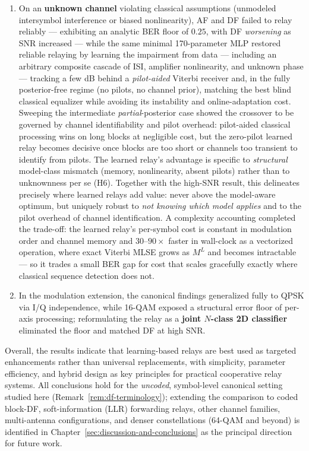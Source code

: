 \begin{enumerate}
    \item On an \textbf{unknown channel} violating classical assumptions (unmodeled intersymbol interference or biased nonlinearity), AF and DF failed to relay reliably --- exhibiting an analytic BER floor of $0.25$, with DF \emph{worsening} as SNR increased --- while the same minimal 170-parameter MLP restored reliable relaying by learning the impairment from data --- including an arbitrary composite cascade of ISI, amplifier nonlinearity, and unknown phase --- tracking a few dB behind a \emph{pilot-aided} Viterbi receiver and, in the fully posterior-free regime (no pilots, no channel prior), matching the best blind classical equalizer while avoiding its instability and online-adaptation cost. Sweeping the intermediate \emph{partial}-posterior case showed the crossover to be governed by channel identifiability and pilot overhead: pilot-aided classical processing wins on long blocks at negligible cost, but the zero-pilot learned relay becomes decisive once blocks are too short or channels too transient to identify from pilots. The learned relay's advantage is specific to \emph{structural} model-class mismatch (memory, nonlinearity, absent pilots) rather than to unknownness per se (H6). Together with the high-SNR result, this delineates precisely where learned relays add value: never above the model-aware optimum, but uniquely robust to \emph{not knowing which model applies} and to the pilot overhead of channel identification. A complexity accounting completed the trade-off: the learned relay's per-symbol cost is constant in modulation order and channel memory and $30$--$90\times$ faster in wall-clock as a vectorized operation, where exact Viterbi MLSE grows as $M^{L}$ and becomes intractable --- so it trades a small BER gap for cost that scales gracefully exactly where classical sequence detection does not.
    \item In the modulation extension, the canonical findings generalized fully to QPSK via I/Q independence, while 16-QAM exposed a structural error floor of per-axis processing; reformulating the relay as a \textbf{joint $N$-class 2D classifier} eliminated the floor and matched DF at high SNR.
\end{enumerate}

Overall, the results indicate that learning-based relays are best used as targeted enhancements rather than universal replacements, with simplicity, parameter efficiency, and hybrid design as key principles for practical cooperative relay systems. All conclusions hold for the \emph{uncoded}, symbol-level canonical setting studied here (Remark~\ref{rem:df-terminology}); extending the comparison to coded block-DF, soft-information (LLR) forwarding relays, other channel families, multi-antenna configurations, and denser constellations (64-QAM and beyond) is identified in Chapter~\ref{sec:discussion-and-conclusions} as the principal direction for future work.

